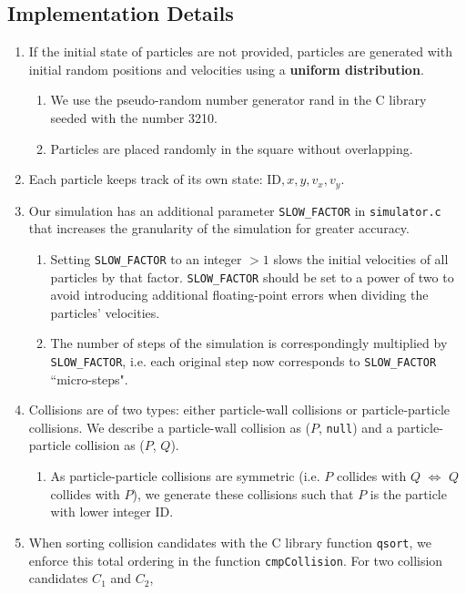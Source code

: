 \documentclass[12pt]{article}
\begin{document}
\pagebreak

\subsection{Implementation Details}

\begin{enumerate}
	\item If the initial state of particles are not provided, particles are generated with initial random positions and velocities using a \textbf{uniform distribution}.
	\begin{enumerate}
		\item We use the pseudo-random number generator rand in the C library seeded with the number 3210.
		\item Particles are placed randomly in the square without overlapping.
	\end{enumerate}
	\item Each particle keeps track of its own state: $\textrm{ID}, x, y, v_x, v_y$.
	\item Our simulation has an additional parameter \texttt{SLOW\_FACTOR} in \texttt{simulator.c} that increases the granularity of the simulation for greater accuracy. \label{slow-factor-ref}
	\begin{enumerate}
		\item Setting \texttt{SLOW\_FACTOR} to an integer $>1$ slows the initial velocities of all particles by that factor. \texttt{SLOW\_FACTOR} should be set to a power of two to avoid introducing additional floating-point errors when dividing the particles’ velocities.
		\item The number of steps of the simulation is correspondingly multiplied by \texttt{SLOW\_FACTOR}, i.e. each original step now corresponds to \texttt{SLOW\_FACTOR} ``micro-steps".
	\end{enumerate}
	\item Collisions are of two types: either particle-wall collisions or particle-particle collisions. We describe a particle-wall collision as ($P$, \texttt{null}) and a particle-particle collision as ($P$, $Q$).
	\begin{enumerate}
		\item As particle-particle collisions are symmetric (i.e. $P$ collides with $Q$ $\iff$ $Q$ collides with $P$), we generate these collisions such that $P$ is the particle with lower integer ID.
	\end{enumerate}
	\item When sorting collision candidates with the C library function \texttt{qsort}, we enforce this total ordering in the function \texttt{cmpCollision}. For two collision candidates  $C_1$ and $C_2$,

\end{enumerate}
\end{document}
